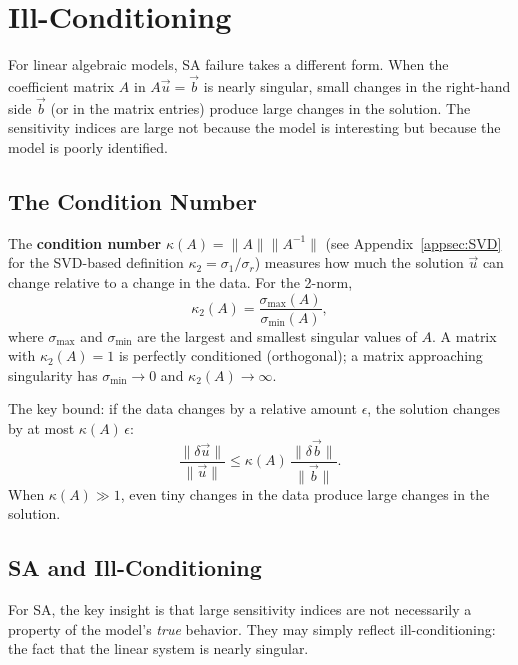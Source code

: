 \section{Ill-Conditioning}
\label{sec:illconditioning}

For linear algebraic models, SA failure takes a different form.
When the coefficient matrix $A$ in $A\vec{u} = \vec{b}$ is
nearly singular, small changes in the right-hand side $\vec{b}$
(or in the matrix entries) produce large changes in the solution.
The sensitivity indices are large not because the model is interesting
but because the model is poorly identified.

\subsection{The Condition Number}

The \textbf{condition number} $\kappa(A) = \|A\|\|A^{-1}\|$
(see Appendix~\ref{appsec:SVD} for the SVD-based definition $\kappa_2 = \sigma_1/\sigma_r$)
measures how much the solution $\vec{u}$ can change relative to
a change in the data. For the 2-norm,
\begin{equation}
  \kappa_2(A) = \frac{\sigma_{\max}(A)}{\sigma_{\min}(A)},
  \label{eq:condnum}
\end{equation}
where $\sigma_{\max}$ and $\sigma_{\min}$ are the largest and smallest
singular values of $A$. A matrix with $\kappa_2(A) = 1$ is perfectly
conditioned (orthogonal); a matrix approaching singularity has
$\sigma_{\min} \to 0$ and $\kappa_2(A) \to \infty$.

The key bound: if the data changes by a relative amount $\epsilon$,
the solution changes by at most $\kappa(A)\,\epsilon$:
\[
  \frac{\|\delta\vec{u}\|}{\|\vec{u}\|} \leq \kappa(A)\,
  \frac{\|\delta\vec{b}\|}{\|\vec{b}\|}.
\]
When $\kappa(A) \gg 1$, even tiny changes in the data produce
large changes in the solution.

\subsection{SA and Ill-Conditioning}

For SA, the key insight is that large sensitivity indices are not
necessarily a property of the model's \emph{true} behavior.
They may simply reflect ill-conditioning: the fact that the linear
system is nearly singular.

